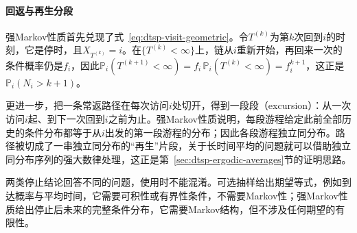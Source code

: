 \paragraph{回返与再生分段}
强Markov性质首先兑现了式~\eqref{eq:dtsp-visit-geometric}。令$T^{(k)}$为第$k$次回到$i$的时刻，它是停时，且$X_{T^{(k)}}=i$。在$\{T^{(k)}<\infty\}$上，链从$i$重新开始，再回来一次的条件概率仍是$f_i$，因此$\mathbb P_i(T^{(k+1)}<\infty)=f_i\,\mathbb P_i(T^{(k)}<\infty)=f_i^{k+1}$，这正是$\mathbb P_i(N_i>k+1)$。

更进一步，把一条常返路径在每次访问$i$处切开，得到一段段（excursion）：从一次访问$i$起、到下一次回到$i$之前为止。强Markov性质说明，每段游程给定此前全部历史的条件分布都等于从$i$出发的第一段游程的分布；因此各段游程独立同分布。路径被切成了一串独立同分布的“再生”片段，关于长时间平均的问题就可以借助独立同分布序列的强大数律处理，这正是第~\ref{sec:dtsp-ergodic-averages}节的证明思路。

两类停止结论回答不同的问题，使用时不能混淆。可选抽样给出期望等式，例如到达概率与平均时间，它需要可积性或有界性条件，不需要Markov性；强Markov性质给出停止后未来的完整条件分布，它需要Markov结构，但不涉及任何期望的有限性。
